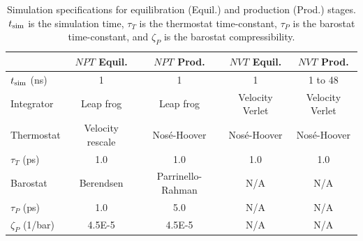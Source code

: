\documentclass[preprint,review,12pt]{elsarticle}
\begin{document}

	\begin{table}[htbp!]
		\caption{Simulation specifications for equilibration (Equil.) and production (Prod.) stages. $t_{\rm sim}$ is the simulation time, $\tau_{T}$ is the thermostat time-constant, $\tau_{P}$ is the barostat time-constant, and $\zeta_{P}$ is the barostat compressibility.} \label{tab:thermostats_barostats}
		\begin{tabular}{|l|c|c|c|c|}
			\hline
			& $NPT$ Equil. & $NPT$ Prod. & $NVT$ Equil. & $NVT$ Prod. \\ \hline
			$t_{\rm sim}$ (ns) & 1 & 1 & 1 & 1 to 48 \\ \hline
			Integrator & Leap frog \cite{Hockney1974} & Leap frog & Velocity Verlet \cite{Swope1982} & Velocity Verlet \\ \hline 
			Thermostat & Velocity rescale \cite{Bussi2007} & Nos{\'e}-Hoover \cite{Hoover1985,Nose1984} & Nos{\'e}-Hoover & Nos{\'e}-Hoover \\ \hline 
			$\tau_{T}$ (ps) & 1.0 & 1.0 & 1.0 & 1.0 \\ \hline
			Barostat & Berendsen \cite{Berendsen1984} & Parrinello-Rahman \cite{Nose1983,Parrinello1981} & N/A & N/A \\ \hline
			$\tau_{P}$ (ps) & 1.0 & 5.0 & N/A & N/A \\ \hline
			$\zeta_{P}$ (1/bar) & 4.5E-5 & 4.5E-5 & N/A & N/A \\
			\hline
		\end{tabular}
	\end{table}
\end{document}
